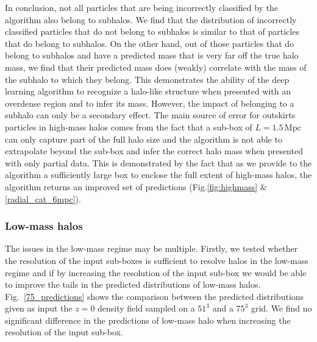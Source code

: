 \documentclass[11pt]{article}
\begin{document}
In conclusion, not all particles that are being incorrectly classified by the algorithm also belong to subhalos. We find that the distribution of incorrectly classified particles that do not belong to subhalos is similar to that of particles that do belong to subhalos. On the other hand, out of those particles that do belong to subhalos and have a predicted mass that is very far off the true halo mass, we find that their predicted mass does (weakly) correlate with the mass of the subhalo to which they belong. This demonstrates the ability of the deep learning algorithm to recognize a halo-like structure when presented with an overdense region and to infer its mass. However, the impact of belonging to a subhalo can only be a secondary effect. The main source of error for outskirts particles in high-mass halos comes from the fact that a sub-box of $L=1.5\, \mathrm{Mpc}$ can only capture part of the full halo size and the algorithm is not able to extrapolate beyond the sub-box and infer the correct halo mass when presented with only partial data. This is demonstrated by the fact that as we provide to the algorithm a sufficiently large box to enclose the full extent of high-mass halos, the algorithm returns an improved set of predictions (Fig.\ref{fig:highmass} \&\ref{radial_cat_6mpc}).

\subsubsection{Low-mass halos}

The issues in the low-mass regime may be multiple. Firstly, we tested whether the resolution of the input sub-boxes is sufficient to resolve halos in the low-mass regime and if by increasing the resolution of the input sub-box we would be able to improve the tails in the predicted distributions of low-mass halos. Fig.~\ref{75_predictions} shows the comparison between the predicted distributions given as input the $z=0$ density field sampled on a $51^3$ and a $75^3$ grid. We find no significant difference in the predictions of low-mass halo when increasing the resolution of the input sub-box.
\end{document}
